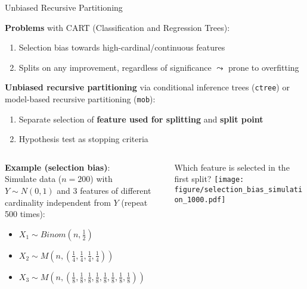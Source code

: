 \documentclass[11pt,compress,t,notes=noshow, aspectratio=169, xcolor=table]{beamer}
\begin{document}
\begin{frame}{Unbiased Recursive Partitioning}  
\vspace{-0.2cm}

\vspace{0.2cm}
\textbf{Problems} with CART (Classification and Regression Trees): 

\begin{enumerate}
    \item Selection bias towards high-cardinal/continuous features 
    \item Splits on any improvement, regardless of significance $\leadsto$ prone to overfitting
\end{enumerate}
\smallskip
\pause
\textbf{Unbiased recursive partitioning} via conditional inference trees (\texttt{ctree}) or model-based recursive partitioning (\texttt{mob}): 
\begin{enumerate}  
  \item Separate selection of \textbf{feature used for splitting} and \textbf{split point}
  \item Hypothesis test as stopping criteria 
\end{enumerate}
\pause
\begin{columns}[T, totalwidth = \textwidth]
    \begin{column}{0.5\textwidth}
    \textbf{Example (selection bias)}: \\
         Simulate data ($n = 200$) with $Y \sim N(0,1)$ and 3 features of different cardinality independent from $Y$ (repeat 500 times):
\begin{itemize}
    \item $X_1 \sim Binom(n, \frac{1}{2})$
    \item $X_2 \sim M(n, (\frac{1}{4}, \frac{1}{4}, \frac{1}{4}, \frac{1}{4}))$
    \item $X_3 \sim M(n, (\frac{1}{8}, \frac{1}{8}, \frac{1}{8}, \frac{1}{8}, \frac{1}{8}, \frac{1}{8}, \frac{1}{8}, \frac{1}{8}))$
\end{itemize}
    \end{column}
    \begin{column}{0.5\textwidth}
    \scriptsize
    \centering
    Which feature is selected in the first split?
    \texttt{[image: figure/selection\_bias\_simulation\_1000.pdf]}
    \end{column}
\end{columns}
    

\end{frame}
\end{document}
